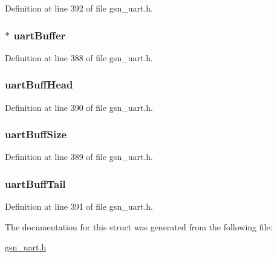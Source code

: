 Definition at line 392 of file gsn\_\-uart.h.

\hypertarget{a00267_abf2bee2b895436869a2c195cd903b51c}{
\subsubsection[{uartBuffer}]{$\ast$ {\bf uartBuffer}}}
\label{a00267_abf2bee2b895436869a2c195cd903b51c}


Definition at line 388 of file gsn\_\-uart.h.

\hypertarget{a00267_a5b070dc039f0b2602e5ddf5632f2275c}{
\subsubsection[{uartBuffHead}]{ {\bf uartBuffHead}}}
\label{a00267_a5b070dc039f0b2602e5ddf5632f2275c}


Definition at line 390 of file gsn\_\-uart.h.

\hypertarget{a00267_a7b40e36ac25003b4d00941ab3f8a263a}{
\subsubsection[{uartBuffSize}]{ {\bf uartBuffSize}}}
\label{a00267_a7b40e36ac25003b4d00941ab3f8a263a}


Definition at line 389 of file gsn\_\-uart.h.

\hypertarget{a00267_aae708187345941a786f280aae69fad60}{
\subsubsection[{uartBuffTail}]{ {\bf uartBuffTail}}}
\label{a00267_aae708187345941a786f280aae69fad60}


Definition at line 391 of file gsn\_\-uart.h.



The documentation for this struct was generated from the following file:\begin{DoxyCompactItemize}
\item 
\hyperlink{a00600}{gsn\_\-uart.h}\end{DoxyCompactItemize}
